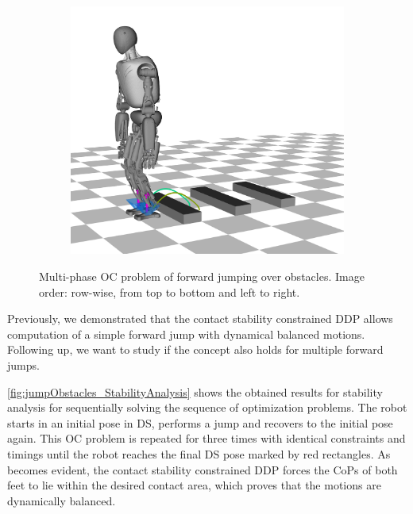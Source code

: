 \begin{figure}[h!]
\begin{subfigure}{.33\textwidth}
	\includegraphics[width=1\linewidth]{fig/jumpObstacles/snaps/7x}
	\caption{}
\end{subfigure}%
\caption[Multi-phase \gls{OC} problem of forward jumping over obstacles]{Multi-phase \gls{OC} problem of forward jumping over obstacles. Image order: row-wise, from top to bottom and left to right.}
\label{fig:jumpObstacles_Snaps}
\end{figure} 

Previously, we demonstrated that the contact stability constrained \gls{DDP} allows computation of a simple forward jump with dynamical balanced motions. Following up, we want to study if the concept also holds for multiple forward jumps. 

\cref{fig:jumpObstacles_StabilityAnalysis} shows the obtained results for stability analysis for sequentially solving the sequence of optimization problems. The robot starts in an initial pose in \gls{DS}, performs a jump and recovers to the initial pose again. This \gls{OC} problem is repeated for three times with identical constraints and timings until the robot reaches the final \gls{DS} pose marked by red rectangles. As becomes evident, the contact stability constrained \gls{DDP} forces the \gls{CoP}s of both feet to lie within the desired contact area, which proves that the motions are dynamically balanced. 

